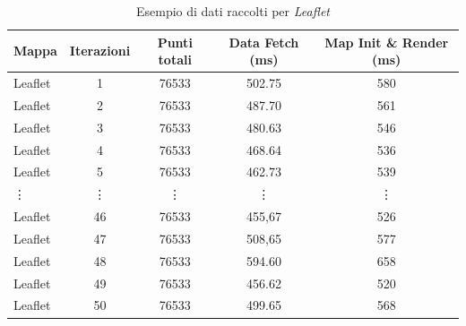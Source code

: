 \begin{table}[ht]
  \centering
  \caption{Esempio di dati raccolti per \textit{Leaflet}} %
  \label{tab:csv-metriche-mappe} 
  \begin{tabular}{ l S[table-format=1.0] S[table-format=5.0] S[table-format=3.2]
  S[table-format=3.0] }
    \toprule \textbf{Mappa} & \textbf{Iterazioni} & \textbf{Punti totali} & \textbf{Data Fetch (ms)} & \textbf{Map Init \& Render (ms)} \\
    \midrule Leaflet        & 1                   & 76533                 & 502.75                   & 580                              \\
    Leaflet                 & 2                   & 76533                 & 487.70                   & 561                              \\
    Leaflet                 & 3                   & 76533                 & 480.63                   & 546                              \\
    Leaflet                 & 4                   & 76533                 & 468.64                   & 536                              \\
    Leaflet                 & 5                   & 76533                 & 462.73                   & 539                              \\
    \vdots                  & \vdots              & \vdots                & \vdots                   & \vdots                           \\
    Leaflet                 & 46                  & 76533                 & 455,67                   & 526                              \\
    Leaflet                 & 47                  & 76533                 & 508,65                   & 577                              \\
    Leaflet                 & 48                  & 76533                 & 594.60                   & 658                              \\
    Leaflet                 & 49                  & 76533                 & 456.62                   & 520                              \\
    Leaflet                 & 50                  & 76533                 & 499.65                   & 568                              \\
    \bottomrule
  \end{tabular}
\end{table}

